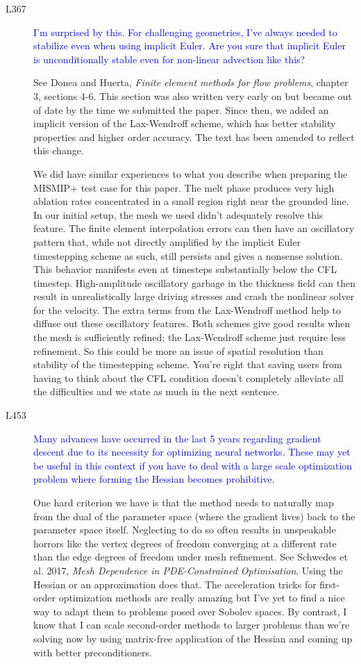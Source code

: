 \documentclass{article}
\theoremstyle{definition}
\theoremstyle{plain}
\begin{document}
\begin{description}
\item[L367] \textcolor{blue}{I'm surprised by this. For challenging geometries, I've always needed to
stabilize even when using implicit Euler. Are you sure that implicit Euler
is unconditionally stable even for non-linear advection like this?}

See Donea and Huerta, \emph{Finite element methods for flow problems}, chapter 3, sections 4-6.
This section was also written very early on but became out of date by the time we submitted the paper.
Since then, we added an implicit version of the Lax-Wendroff scheme, which has better stability properties and higher order accuracy.
The text has been amended to reflect this change.

We did have similar experiences to what you describe when preparing the MISMIP+ test case for this paper.
The melt phase produces very high ablation rates concentrated in a small region right near the grounded line.
In our initial setup, the mesh we used didn't adequately resolve this feature.
The finite element interpolation errors can then have an oscillatory pattern that, while not directly amplified by the implicit Euler timestepping scheme as such, still persists and gives a nonsense solution.
This behavior manifests even at timesteps substantially below the CFL timestep.
High-amplitude oscillatory garbage in the thickness field can then result in unrealistically large driving stresses and crash the nonlinear solver for the velocity.
The extra terms from the Lax-Wendroff method help to diffuse out these oscillatory features.
Both schemes give good results when the mesh is sufficiently refined; the Lax-Wendroff scheme just require less refinement.
So this could be more an issue of spatial resolution than stability of the timestepping scheme.
You're right that saving users from having to think about the CFL condition doesn't completely alleviate all the difficulties and we state as much in the next sentence.

\item[L453] \textcolor{blue}{Many advances have occurred in the last 5 years regarding gradient descent due to its necessity for optimizing neural networks. These may yet
be useful in this context if you have to deal with a large scale optimization
problem where forming the Hessian becomes prohibitive.}

One hard criterion we have is that the method needs to naturally map from the dual of the parameter space (where the gradient lives) back to the parameter space itself.
Neglecting to do so often results in unspeakable horrors like the vertex degrees of freedom converging at a different rate than the edge degrees of freedom under mesh refinement.
See Schwedes et al. 2017, \emph{Mesh Dependence in PDE-Constrained Optimisation}.
Using the Hessian or an approximation does that.
The acceleration tricks for first-order optimization methods are really amazing but I've yet to find a nice way to adapt them to problems posed over Sobolev spaces.
By contrast, I know that I can scale second-order methods to larger problems than we're solving now by using matrix-free application of the Hessian and coming up with better preconditioners.


\end{description}
\end{document}

